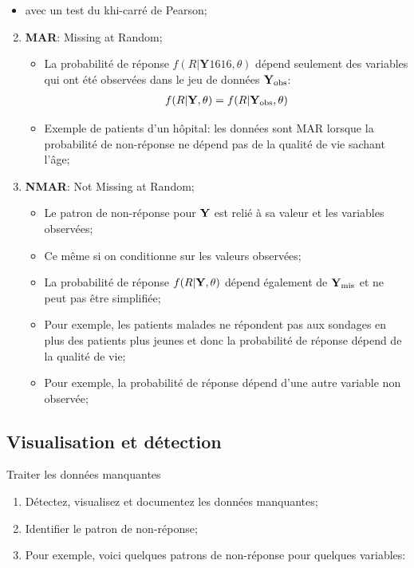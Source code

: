 \documentclass[10pt, french]{article}
\begin{document}
\begin{multicols*}{3}
\begin{enumerate}
\begin{itemize}
		\item[]	avec un test du khi-carré de Pearson;
		\end{itemize}	
\end{enumerate}
\begin{enumerate}
	\setcounter{enumi}{1}
	\item	\textbf{MAR}: Missing at Random;
		\begin{itemize}
		\item	La probabilité de réponse $f(R | \bm{Y}1616, \theta)$ dépend seulement des variables qui ont été observées dans le jeu de données $\mathbf{Y}_{\text{obs}}$:
			\begin{align*}
			f(R | \mathbf{Y}, \theta) &= f(R | \mathbf{Y}_{\text{obs}}, \theta) \\
			\end{align*}
		\item	Exemple de patients d'un hôpital: les données sont MAR lorsque la probabilité de non-réponse ne dépend pas de la qualité de vie sachant l'âge;
		\end{itemize}
	\item	\textbf{NMAR}: Not Missing at Random;
		\begin{itemize}
		\item	Le patron de non-réponse pour $\mathbf{Y}$ est relié à sa valeur et les variables observées;
		\item[]	Ce même si on conditionne sur les valeurs observées;
		\item	La probabilité de réponse $f(R | \mathbf{Y}, \theta)$ dépend également de $\mathbf{Y}_{\text{mis}}$ et ne peut pas être simplifiée;
		\item	Pour exemple, les patients malades ne répondent pas aux sondages en plus des patients plus jeunes et donc la probabilité de réponse dépend de la qualité de vie;
		\item	Pour exemple, la probabilité de réponse dépend d'une autre variable non observée;
		\end{itemize}
\end{enumerate}


\subsection*{Visualisation et détection}
\begin{algo}{Traiter les données manquantes}
\begin{enumerate}
	\item	Détectez, visualisez et documentez les données manquantes;
	\item	Identifier le patron de non-réponse;
	\item[]	Pour exemple, voici quelques patrons de non-réponse pour quelques variables:


\end{enumerate}
\end{algo}
\end{multicols*}
\end{document}
